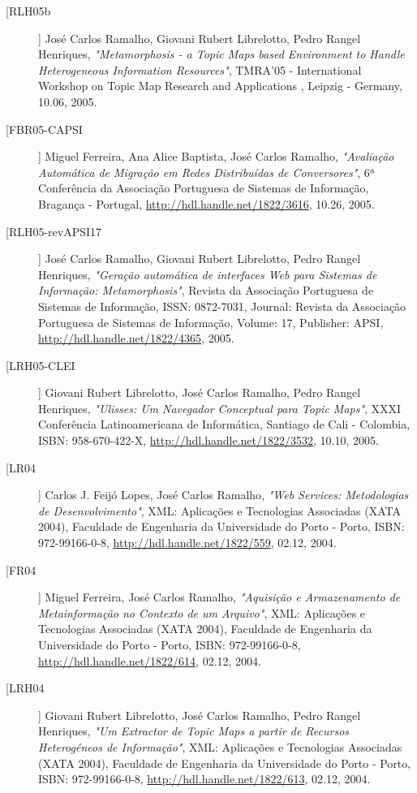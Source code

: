 \begin{description}
\item[[RLH05b]]
    \textsf{José Carlos Ramalho, Giovani Rubert Librelotto, Pedro Rangel Henriques}, \emph{"Metamorphosis - a Topic Maps based Environment to Handle Heterogeneous Information Resources"}, TMRA'05 - International Workshop on  Topic Map Research and Applications , Leipzig - Germany, 10.06, 2005.

\item[[FBR05-CAPSI]]
    \textsf{Miguel Ferreira, Ana Alice Baptista, José Carlos Ramalho}, \emph{"Avaliação Automática de Migração em Redes Distribuídas de Conversores"}, 6ª Conferência da Associação Portuguesa de Sistemas de Informação, Bragança - Portugal, \url{http://hdl.handle.net/1822/3616}, 10.26, 2005.

\item[[RLH05-revAPSI17]]
    \textsf{José Carlos Ramalho, Giovani Rubert Librelotto, Pedro Rangel Henriques}, \emph{"Geração automática de interfaces Web para Sistemas de Informação: Metamorphosis"}, Revista da Associação Portuguesa de Sistemas de Informação, ISSN: 0872-7031, Journal: Revista da Associação Portuguesa de Sistemas de Informação, Volume: 17, Publisher: APSI, \url{http://hdl.handle.net/1822/4365}, 2005.

\item[[LRH05-CLEI]]
    \textsf{Giovani Rubert Librelotto, José Carlos Ramalho, Pedro Rangel Henriques}, \emph{"Ulisses: Um Navegador Conceptual para Topic Maps"}, XXXI Conferência Latinoamericana de Informática, Santiago de Cali - Colombia, ISBN: 958-670-422-X, \url{http://hdl.handle.net/1822/3532}, 10.10, 2005.

\item[[LR04]]
    \textsf{Carlos J. Feijó Lopes, José Carlos Ramalho}, \emph{"Web Services: Metodologias de Desenvolvimento"}, XML: Aplicações e Tecnologias Associadas (XATA 2004), Faculdade de Engenharia da Universidade do Porto - Porto, ISBN: 972-99166-0-8, \url{http://hdl.handle.net/1822/559}, 02.12, 2004.

\item[[FR04]]
    \textsf{Miguel Ferreira, José Carlos Ramalho}, \emph{"Aquisição e Armazenamento de Metainformação no Contexto de um Arquivo"}, XML: Aplicações e Tecnologias Associadas (XATA 2004), Faculdade de Engenharia da Universidade do Porto - Porto, ISBN: 972-99166-0-8, \url{http://hdl.handle.net/1822/614}, 02.12, 2004.

\item[[LRH04]]
    \textsf{Giovani Rubert Librelotto, José Carlos Ramalho, Pedro Rangel Henriques}, \emph{"Um Extractor de Topic Maps a partir de Recursos Heterogéneos de Informação"}, XML: Aplicações e Tecnologias Associadas (XATA 2004), Faculdade de Engenharia da Universidade do Porto - Porto, ISBN: 972-99166-0-8, \url{http://hdl.handle.net/1822/613}, 02.12, 2004.


\end{description}
